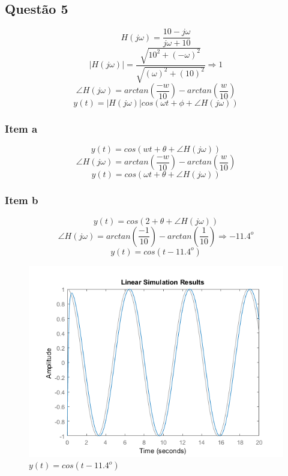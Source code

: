 \documentclass[a4paper, 12pt]{article}
\begin{document}
    \subsection{Quest\~{a}o 5}
	    \[H(j\omega)  = \frac{10 - j\omega}{j\omega + 10} \]
	    \[|H(j\omega)| = \frac{\sqrt{10^{2} + {(-\omega) ^{2}}}}{\sqrt{(\omega)^{2} + (10)^{2}}} \Rightarrow 1\] 
	    \[\angle H(j\omega) = arctan \left(\frac{-w}{10}\right) - arctan \left(\frac{w}{10}\right) \]
	    \[y(t) = |H(j\omega)|cos(\omega t + \phi + \angle H(j\omega))\]   
        \subsubsection{Item a}
        \[y(t) = cos(wt + \theta + \angle H(j\omega))\]
	    \[\angle H(j\omega) = arctan \left(\frac{-w}{10}\right) - arctan \left(\frac{w}{10}\right) \]
	    \[y(t) = cos(\omega t + \theta + \angle H(j\omega))\]
	    \newpage               
        \subsubsection{Item b}
        \[y(t) = cos(2 + \theta + \angle H(j\omega))\]
        \[\angle H(j\omega) = arctan \left(\frac{-1}{10}\right) - arctan \left(\frac{1}{10}\right) \Rightarrow -11.4^{o} \]
        \[y(t) = cos(t -11.4^{o})\]    
		\begin{figure}[!ht]
			\centering
			\includegraphics{img/Q5a.png}
			\caption{$y(t) = cos(t -11.4^{o})$}	
		\end{figure}	    
		\newpage                 
\end{document}
